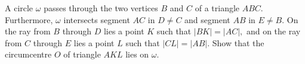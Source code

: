 A circle $\omega$ passes through the two vertices $B$ and $C$ of a triangle $ABC.$ Furthermore, $\omega$  intersects segment $AC$ in $D\ne C$ and segment $AB$ in $E\ne B.$ On the ray from $B$ through $D$ lies a point $K$ such that $|BK| = |AC|,$ and on the ray from $C$  through $E$ lies a point $L$ such that $|CL| = |AB|.$ Show that the circumcentre $O$ of triangle $AKL$ lies on $\omega$.